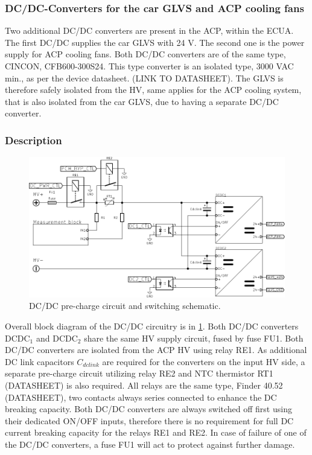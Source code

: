 \subsubsection {DC/DC-Converters for the car GLVS and ACP cooling fans}
Two additional DC/DC converters are present in the ACP, within the ECUA. The first DC/DC supplies the car GLVS with 24 V. The second one is the power supply for ACP cooling fans. Both DC/DC converters are of the same type, CINCON, CFB600-300S24. This type converter is an isolated type, 3000 VAC min., as per the device datasheet. (LINK TO DATASHEET). The GLVS is therefore safely isolated from the HV, same applies for the ACP cooling system, that is also isolated from the car GLVS, due to having a separate DC/DC converter.

\subsubsection{Description}

\begin{figure}[H]
	\centering
	\includegraphics[width=\textwidth,clip]{./img/ECUA_DCDC_PRECHARGE.pdf}
	\caption{DC/DC pre-charge circuit and switching schematic.}
	\label{fig:precharge_dcdc_sch}
\end{figure}

Overall block diagram of the DC/DC circuitry is in \ref{fig:precharge_dcdc_sch}. Both DC/DC converters DCDC$_1$ and DCDC$_2$ share the same HV supply circuit, fused by fuse FU1. Both DC/DC converters are isolated from the ACP HV using relay RE1. As additional DC link capacitors $C_{dclink}$ are required for the converters on the input HV side, a separate pre-charge circuit utilizing relay RE2 and NTC thermistor RT1 (DATASHEET) is also required. 
All relays are the same type, Finder 40.52  (DATASHEET), two contacts always series connected to enhance the DC breaking capacity. Both DC/DC converters are always switched off first using their dedicated ON/OFF inputs, therefore there is no requirement for full DC current breaking capacity for the relays RE1 and RE2. In case of failure of one of the DC/DC converters, a fuse FU1 will act to protect against further damage.

